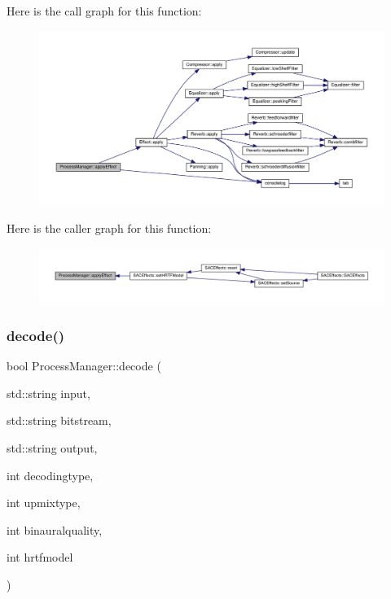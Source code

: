 Here is the call graph for this function\+:
\nopagebreak
\begin{figure}[H]
\begin{center}
\leavevmode
\includegraphics[width=350pt]{class_process_manager_a91a8718847e535f297756fa8604dc8f4_cgraph}
\end{center}
\end{figure}
Here is the caller graph for this function\+:
\nopagebreak
\begin{figure}[H]
\begin{center}
\leavevmode
\includegraphics[width=350pt]{class_process_manager_a91a8718847e535f297756fa8604dc8f4_icgraph}
\end{center}
\end{figure}
\mbox{\label{class_process_manager_ad882d23c995a27ac064826412b5127a8}} 
\subsubsection{\texorpdfstring{decode()}{decode()}}
{\footnotesize\ttfamily bool Process\+Manager\+::decode (\begin{DoxyParamCaption}\item[{std\+::string}]{input,  }\item[{std\+::string}]{bitstream,  }\item[{std\+::string}]{output,  }\item[{int}]{decodingtype,  }\item[{int}]{upmixtype,  }\item[{int}]{binauralquality,  }\item[{int}]{hrtfmodel }\end{DoxyParamCaption})}



